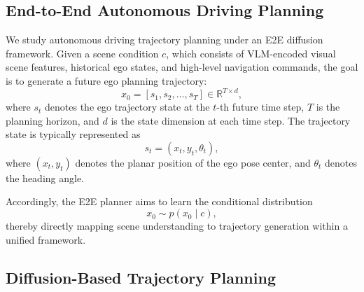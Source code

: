 \documentclass[3p,times,authoryear]{elsarticle}
\begin{document}
\subsection{End-to-End Autonomous Driving Planning}

We study autonomous driving trajectory planning under an E2E diffusion framework. Given a scene condition $c$, which consists of VLM-encoded visual scene features, historical ego states, and high-level navigation commands, the goal is to generate a future ego planning trajectory:
\begin{equation}
x_0 = [s_1, s_2, \ldots, s_T] \in \mathbb{R}^{T \times d},
\end{equation}
where $s_t$ denotes the ego trajectory state at the $t$-th future time step, $T$ is the planning horizon, and $d$ is the state dimension at each time step. The trajectory state is typically represented as
\begin{equation}
s_t = (x_t, y_t, \theta_t),
\end{equation}
where $(x_t, y_t)$ denotes the planar position of the ego pose center, and $\theta_t$ denotes the heading angle.

Accordingly, the E2E planner aims to learn the conditional distribution
\begin{equation}
x_0 \sim p(x_0 \mid c),
\end{equation}
thereby directly mapping scene understanding to trajectory generation within a unified framework.

\subsection{Diffusion-Based Trajectory Planning}
\end{document}
